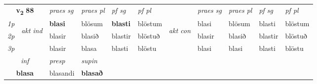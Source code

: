 \noindent
\begin{tabular}{lllllllllll} \toprule
\multicolumn{2}{c}{\textbf{v{\textsubscript{2}}} \Large{\textbf{88}}}  &  \textit{praes sg}  & \textit{praes pl}  &\textit{ pf sg} & \textit{pf pl} &  &  \textit{praes sg}  & \textit{praes pl}  & \textit{pf sg} & \textit{pf pl } \\*
	\cmidrule{3-6} \cmidrule{8-11}
 {\textit{1p}} & \multirow{3}{*}{\begin{turn}{90}\textit{akt ind}\end{turn}} & \textbf{blasi} & blösum & \textbf{blasti} & blöstum & \multirow{3}{*}{\begin{turn}{90}\textit{akt con}\end{turn}} &blasi & blösum & blasti & blöstum\\*
 {\textit{2p}} &  &  blasir  & blasið & blastir & blöstuð & & blasir & blasið & blastir & blöstuð \\*
{\textit{3p}} &  & blasir & blasa & blasti & blöstu & & blasi & blasi& blasti & blöstu \\*
\cmidrule{3-6} \cmidrule{8-11}

   \multicolumn{2}{c}{\textit{inf}}     & \textit{presp} & \textit{supin}   \\*
  \multicolumn{2}{c}{\textbf{blasa}}      & blasandi &  \textbf{blasað}   \\*
\end{tabular}

